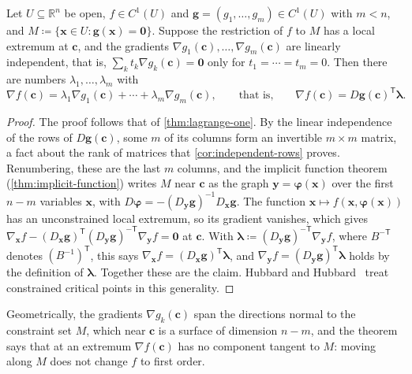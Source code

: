 \begin{theorem}
\label{thm:lagrange}
Let $U\subseteq\mathbb R^n$ be open, $f\in C^1(U)$ and $\mathbf g=(g_1,\ldots,g_m)\in C^1(U)$ with $m<n$, and $M\coloneqq\{\mathbf x\in U: \mathbf g(\mathbf x)=\mathbf0\}$. Suppose the restriction of $f$ to $M$ has a local extremum at $\mathbf c$, and the gradients $\nabla g_1(\mathbf c),\ldots,\nabla g_m(\mathbf c)$ are linearly independent, that is, $\sum_kt_k\nabla g_k(\mathbf c)=\mathbf0$ only for $t_1=\cdots=t_m=0$. Then there are numbers $\lambda_1,\ldots,\lambda_m$ with
\[
\nabla f(\mathbf c)=\lambda_1\nabla g_1(\mathbf c)+\cdots+\lambda_m\nabla g_m(\mathbf c),\qquad\text{that is,}\qquad\nabla f(\mathbf c)=D\mathbf g(\mathbf c)^{\mathsf T}\boldsymbol\lambda .
\]
\end{theorem}

\begin{proof}
The proof follows that of \cref{thm:lagrange-one}. By the linear independence of the rows of $D\mathbf g(\mathbf c)$, some $m$ of its columns form an invertible $m\times m$ matrix, a fact about the rank of matrices that \cref{cor:independent-rows} proves. Renumbering, these are the last $m$ columns, and the implicit function theorem (\cref{thm:implicit-function}) writes $M$ near $\mathbf c$ as the graph $\mathbf y=\boldsymbol\varphi(\mathbf x)$ over the first $n-m$ variables $\mathbf x$, with $D\boldsymbol\varphi=-(D_{\mathbf y}\mathbf g)^{-1}D_{\mathbf x}\mathbf g$. The function $\mathbf x\mapsto f(\mathbf x,\boldsymbol\varphi(\mathbf x))$ has an unconstrained local extremum, so its gradient vanishes, which gives $\nabla_{\mathbf x}f-(D_{\mathbf x}\mathbf g)^{\mathsf T}(D_{\mathbf y}\mathbf g)^{-\mathsf T}\nabla_{\mathbf y}f=\mathbf0$ at $\mathbf c$. With $\boldsymbol\lambda\coloneqq(D_{\mathbf y}\mathbf g)^{-\mathsf T}\nabla_{\mathbf y}f$, where $B^{-\mathsf T}$ denotes $(B^{-1})^{\mathsf T}$, this says $\nabla_{\mathbf x}f=(D_{\mathbf x}\mathbf g)^{\mathsf T}\boldsymbol\lambda$, and $\nabla_{\mathbf y}f=(D_{\mathbf y}\mathbf g)^{\mathsf T}\boldsymbol\lambda$ holds by the definition of $\boldsymbol\lambda$. Together these are the claim. Hubbard and Hubbard~\cite[Sect.~3.7]{hubbard2015vector} treat constrained critical points in this generality.
\end{proof}

Geometrically, the gradients $\nabla g_k(\mathbf c)$ span the directions normal to the constraint set $M$, which near $\mathbf c$ is a surface of dimension $n-m$, and the theorem says that at an extremum $\nabla f(\mathbf c)$ has no component tangent to $M$: moving along $M$ does not change $f$ to first order.

